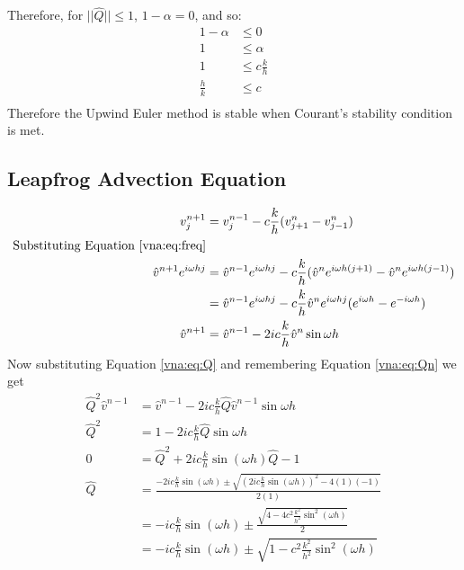 Therefore, for $||\hat{Q}|| \leq 1$, $1-\alpha=0$, and so:
\begin{equation*}
\begin{aligned}
    1 - \alpha 	&\leq 0			\\
    1 		&\leq \alpha		\\
    1 		&\leq c \frac{k}{h}	\\
    \frac{h}{k}	&\leq c			\\
\end{aligned}
\end{equation*}
Therefore the Upwind Euler method is stable when Courant's stability condition is met.
\subsection{Leapfrog Advection Equation}
\begin{equation*}
\begin{aligned}
    v_j^{n+1}	&= v_j^{n-1} - c\frac{k}{h}(v_{j+1}^n - v_{j-1}^n) 										\\
    \text{Substituting Equation \ref{vna:eq:freq}} 												\\
    \hat{v}^{n+1}e^{i\omega hj} &= \hat{v}^{n-1}e^{i\omega hj} 	- c\frac{k}{h} (\hat{v}^ne^{i\omega h(j+1)} - \hat{v}^ne^{i\omega h(j-1)})	\\
				&= \hat{v}^{n-1}e^{i\omega hj} 	- c\frac{k}{h} \hat{v}^{n}e^{i\omega hj} (e^{i\omega h} - e^{-i\omega h})	\\
    \hat{v}^{n+1}		&= \hat{v}^{n-1}		- 2 i c\frac{k}{h} \hat{v}^{n} \sin \omega h					\\
\end{aligned}
\end{equation*}
Now substituting Equation \ref{vna:eq:Q} and remembering Equation \ref{vna:eq:Qn} we get
\begin{equation*}
\begin{aligned}
    \hat{Q}^2\hat{v}^{n-1}	&= \hat{v}^{n-1} - 2 i c\frac{k}{h} \hat{Q} \hat{v}^{n-1} \sin \omega h				\\
    \hat{Q}^2	&= 1 - 2 i c\frac{k}{h} \hat{Q} \sin \omega h									\\
    0 		&= \hat{Q}^2 + 2 i c\frac{k}{h} \sin( \omega h )\hat{Q} - 1							\\
    \hat{Q} 	& = \frac{-2 i c\frac{k}{h} \sin( \omega h ) \pm \sqrt{(2 i c\frac{k}{h} \sin( \omega h ))^2 - 4(1)(-1)}}{2(1)}	\\
		& = -i c\frac{k}{h} \sin( \omega h ) \pm \frac{ \sqrt{4 -4 c^2\frac{k^2}{h^2} \sin^2( \omega h )}}{2}		\\
		& = -i c\frac{k}{h} \sin( \omega h ) \pm \sqrt{1 -c^2\frac{k^2}{h^2} \sin^2( \omega h )}			\\
\end{aligned}
\end{equation*}
